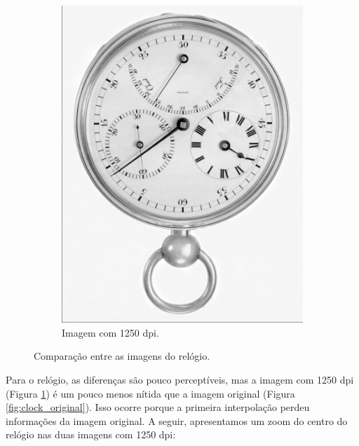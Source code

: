 \documentclass{article}
\begin{document}
\begin{figure}[h]
\begin{subfigure}[b]{0.3\textwidth}
            \includegraphics[width=\textwidth, angle=180]{figures/clock_b.tif.png}
            \caption{Imagem com 1250 dpi.}
            \label{fig:clock_1250dpi}
        \end{subfigure}
        \caption{Comparação entre as imagens do relógio.}
        \label{fig:clock_comparison}
\end{figure}
Para o relógio, as diferenças são pouco perceptíveis, mas a imagem com 1250 dpi (Figura \ref{fig:clock_1250dpi}) é um pouco menos nítida que a imagem original (Figura \ref{fig:clock_original}). Isso ocorre porque a primeira interpolação perdeu informações da imagem original.
A seguir, apresentamos um zoom do centro do relógio nas duas imagens com 1250 dpi:
\end{document}
